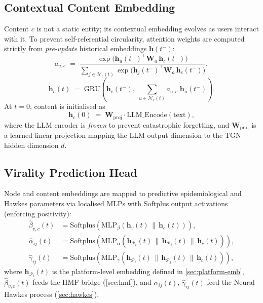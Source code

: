 \documentclass[11pt]{article}
\newcommand{\hv}{\mathbf{h}}
\newcommand{\bW}{\mathbf{W}}
\newcommand{\cN}{\mathcal{N}}
\newcommand{\cP}{\mathcal{P}}
\begin{document}
\subsection{Contextual Content Embedding}
\label{sec:content-emb}

Content $c$ is not a static entity; its contextual embedding evolves as users
interact with it. To prevent self-referential circularity, attention weights are
computed strictly from \emph{pre-update} historical embeddings $\hv(t^-)$:
\begin{equation}
  a_{u,c} \;=\;
  \frac{
    \exp\!\bigl(\hv_u(t^-)^\top \bW_a\, \hv_c(t^-)\bigr)
  }{
    \displaystyle\sum_{j\in\cN_c(t)}
    \exp\!\bigl(\hv_j(t^-)^\top \bW_a\, \hv_c(t^-)\bigr)
  },
  \label{eq:attn}
\end{equation}
\begin{equation}
  \hv_c(t) \;=\; \mathrm{GRU}\!\!\left(
    \hv_c(t^-),\;
    \sum_{u\in\cN_c(t)} a_{u,c}\;\hv_u(t^-)
  \right).
  \label{eq:content-emb}
\end{equation}
At $t=0$, content is initialised as
\begin{equation}
  \hv_c(0) \;=\; \bW_{\mathrm{proj}}\cdot\mathrm{LLM\_Encode}(\text{text}),
  \label{eq:content-init}
\end{equation}
where the LLM encoder is \emph{frozen} to prevent catastrophic forgetting, and
$\bW_{\mathrm{proj}}$ is a learned linear projection mapping the LLM output
dimension to the TGN hidden dimension $d$.

\subsection{Virality Prediction Head}
\label{sec:virality-head}

Node and content embeddings are mapped to predictive epidemiological and Hawkes
parameters via localised MLPs with Softplus output activations (enforcing
positivity):
\begin{align}
  \hat{\beta}_{v,c}(t) &= \mathrm{Softplus}\!\left(
    \mathrm{MLP}_\beta\!\left(\hv_v(t) \,\|\, \hv_c(t)\right)
  \right), \label{eq:beta-hat}\\
  \hat{\alpha}_{ij}(t) &= \mathrm{Softplus}\!\left(
    \mathrm{MLP}_\alpha\!\left(
      \hv_{\cP_i}(t) \,\|\, \hv_{\cP_j}(t) \,\|\, \hv_c(t)
    \right)
  \right), \label{eq:alpha-hat}\\
  \hat{\gamma}_{ij}(t) &= \mathrm{Softplus}\!\left(
    \mathrm{MLP}_\gamma\!\left(
      \hv_{\cP_i}(t) \,\|\, \hv_{\cP_j}(t) \,\|\, \hv_c(t)
    \right)
  \right), \label{eq:gamma-hat}
\end{align}
where $\hv_{\cP_i}(t)$ is the platform-level embedding defined in
\cref{sec:platform-emb}, $\hat{\beta}_{v,c}(t)$ feeds the HMF bridge
(\cref{sec:hmf}), and $\hat{\alpha}_{ij}(t)$, $\hat{\gamma}_{ij}(t)$ feed the
Neural Hawkes process (\cref{sec:hawkes}).
\end{document}
